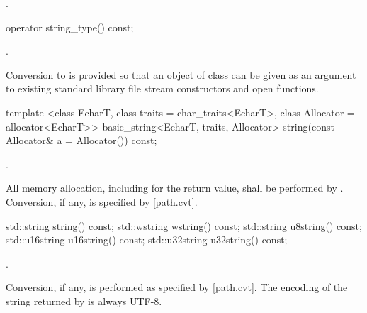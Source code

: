 \begin{itemdescr}
\pnum
\returns {}.
\end{itemdescr}

\begin{itemdecl}
operator string_type() const;
\end{itemdecl}

\begin{itemdescr}
\pnum
\returns {}.

\pnum
\begin{note} Conversion to  is provided so that an
  object of class  can be given as an argument to existing
  standard library file stream constructors and open functions. \end{note}
\end{itemdescr}

\begin{itemdecl}
template <class EcharT, class traits = char_traits<EcharT>,
          class Allocator = allocator<EcharT>>
  basic_string<EcharT, traits, Allocator>
    string(const Allocator& a = Allocator()) const;
\end{itemdecl}

\begin{itemdescr}
\pnum
\returns {}.

\pnum
\remarks All memory allocation, including for the return value, shall
be performed by . Conversion, if any, is specified by
\ref{path.cvt}.
\end{itemdescr}

\begin{itemdecl}
std::string string() const;
std::wstring wstring() const;
std::string u8string() const;
std::u16string u16string() const;
std::u32string u32string() const;
\end{itemdecl}

\begin{itemdescr}
\pnum
\returns {}.

\pnum
\remarks Conversion, if any, is performed as specified
by \ref{path.cvt}.
The encoding of the string returned by  is always UTF-8.
\end{itemdescr}


